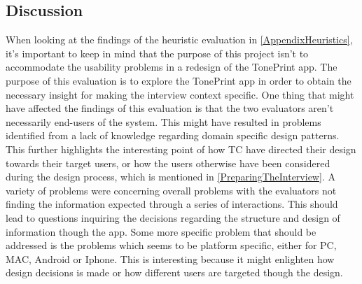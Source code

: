 \subsection{Discussion}
\label{HeuristicDiscussion}
%
When looking at the findings of the heuristic evaluation in \autoref{AppendixHeuristics}, it's important to keep in mind that the purpose of this project isn't to accommodate the usability problems in a redesign of the TonePrint app. The purpose of this evaluation is to explore the TonePrint app in order to obtain the necessary insight for making the interview context specific. One thing that might have affected the findings of this evaluation is that the two evaluators aren't necessarily end-users of the system. This might have resulted in problems identified from a lack of knowledge regarding domain specific design patterns. This further highlights the interesting point of how TC have directed their design towards their target users, or how the users otherwise have been considered during the design process, which is mentioned in \autoref{PreparingTheInterview}. A variety of problems were concerning overall problems with the evaluators not finding the information expected through a series of interactions. This should lead to questions inquiring the decisions regarding the structure and design of information though the app. Some more specific problem that should be addressed is the problems which seems to be platform specific, either for PC, MAC, Android or Iphone. This is interesting because it might enlighten how design decisions is made or how different users are targeted though the design.






